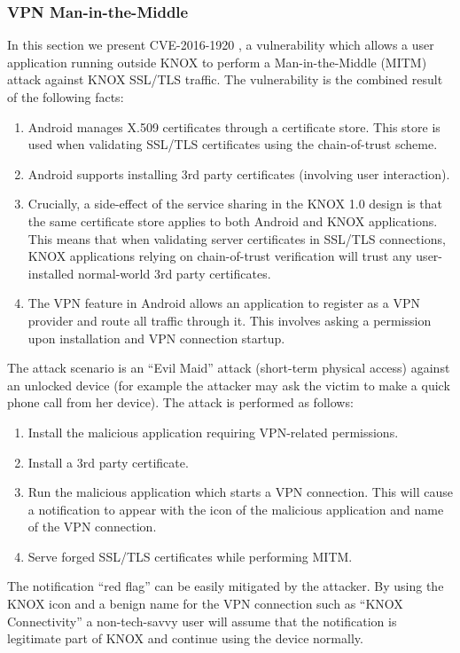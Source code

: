 \documentclass[11pt]{article}
\begin{document}
\subsubsection{VPN Man-in-the-Middle} \label{knox-1.0-attacks-vpn-mitm}
In this section we present CVE-2016-1920 \cite{CVE-2016-1920}, a vulnerability which allows a user application running outside KNOX to perform a Man-in-the-Middle (MITM) attack against KNOX SSL/TLS traffic.
The vulnerability is the combined result of the following facts:
\begin{enumerate}[itemsep=0pt]
\item Android manages X.509 certificates through a certificate store. This store is used when validating SSL/TLS certificates using the chain-of-trust scheme.
\item Android supports installing 3rd party certificates (involving user interaction).
\item Crucially, a side-effect of the service sharing in the KNOX 1.0 design is that the same certificate store applies to both Android and KNOX applications.
	This means that when validating server certificates in SSL/TLS connections, KNOX applications relying on chain-of-trust verification will trust any
	user-installed normal-world 3rd party certificates.
\item The VPN feature in Android allows an application to register as a VPN provider and route all traffic through it. This involves asking a permission 
	upon installation and VPN connection startup.
\end{enumerate}

The attack scenario is an ``Evil Maid'' attack (short-term physical access) against an unlocked device (for example the attacker may 
ask the victim to make a quick phone call from her device). The attack is performed as follows:
\begin{enumerate} \setlength{\itemsep}{0pt}
  \item Install the malicious application requiring VPN-related permissions.
  \item Install a 3rd party certificate.
  \item Run the malicious application which starts a VPN connection.
  This will cause a notification to appear with the icon of the malicious application and name of the VPN connection. 
  \item Serve forged SSL/TLS certificates while performing MITM.
\end{enumerate}

The notification ``red flag'' can be easily mitigated by the attacker. 
By using the KNOX icon and a benign name for the VPN connection such as ``KNOX Connectivity'' 
a non-tech-savvy user will assume that the notification is legitimate part of KNOX and continue using the device normally.
\end{document}
